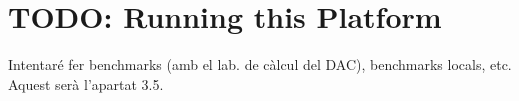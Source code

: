 
\section{TODO: Running this Platform}

Intentaré fer benchmarks (amb el lab. de càlcul del DAC), benchmarks locals,
etc. Aquest serà l'apartat 3.5.